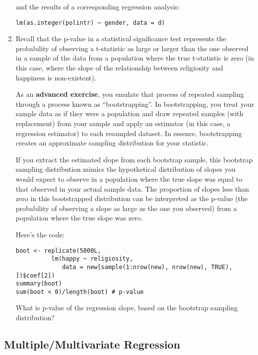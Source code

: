 \documentclass[a4paper,12pt]{article}
\begin{document}
\begin{enumerate}
\noindent and the results of a corresponding regression analysis:

\begin{verbatim}
lm(as.integer(polintr) ~ gender, data = d)
\end{verbatim}

\item Recall that the p-value in a statistical significance test represents the probability of observing a t-statistic as large or larger than the one observed in a sample of the data from a population where the true t-statistic is zero (in this case, where the slope of the relationship between religiosity and happiness is non-existent).

As an \textbf{advanced exercise}, you emulate that process of repeated sampling through a process known as ``bootstrapping''. In bootstrapping, you treat your sample data as if they were a population and draw repeated samples (with replacement) from your sample and apply an estimator (in this case, a regression estimator) to each resampled dataset. In essence, bootstrapping creates an approximate sampling distribution for your statistic.

If you extract the estimated slope from each bootstrap sample, this bootstrap sampling distribution mimics the hypothetical distribution of slopes you would expect to observe in a population where the true slope was equal to that observed in your actual sample data. The proportion of slopes less than zero in this bootstrapped distribution can be interpreted as the p-value (the probability of observing a slope as large as the one you observed) from a population where the true slope was zero.

Here's the code:

\begin{verbatim}
boot <- replicate(5000L, 
          lm(happy ~ religiosity, 
             data = new[sample(1:nrow(new), nrow(new), TRUE), ])$coef[2])
summary(boot)
sum(boot < 0)/length(boot) # p-value
\end{verbatim}

\noindent What is p-value of the regression slope, based on the bootstrap sampling distribution?

\end{enumerate}

\subsection{Multiple/Multivariate Regression}
\end{document}
